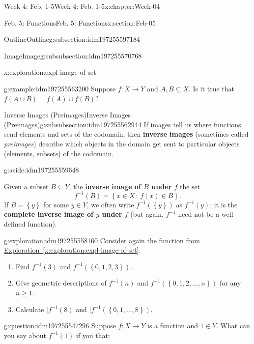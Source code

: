 \documentclass[oneside,10pt,]{book}
\newcommand{\xreffont}{\relax}
\newcommand{\terminology}[1]{\textbf{#1}}
\numberwithin{equation}{section}
\renewcommand{\ge}{\geqslant}
\newcommand{\set}[1]{\left\{ {#1} \right\}}
\newcommand{\setof}[2]{{\left\{#1\,\colon\,#2\right\}}}
\begin{document}
\begin{chapterptx}{Week 4: Feb. 1-5}{}{Week 4: Feb. 1-5}{}{}{x:chapter:Week-04}
\begin{sectionptx}{Feb. 5: Functions}{}{Feb. 5: Functions}{}{}{x:section:Feb-05}
\begin{subsectionptx}{Outline}{}{Outline}{}{}{g:subsection:idm197255597184}
\begin{subsubsectionptx}{Image}{}{Image}{}{}{g:subsubsection:idm197255570768}
\begin{exploration}{}{x:exploration:expl-image-of-set}
\end{exploration}%
\begin{example}{}{g:example:idm197255563200}%
Suppose \(f : X\to Y\) and \(A,B\subseteq X\). Is it true that \(f(A\cup B) = f(A)\cup f(B)\)?%
\end{example}
\end{subsubsectionptx}
%
%
\typeout{************************************************}
\typeout{************************************************}
%
\begin{subsubsectionptx}{Inverse Images (Preimages)}{}{Inverse Images (Preimages)}{}{}{g:subsubsection:idm197255562944}
If images tell us where functions send elements and sets of the codomain, then \terminology{inverse images} (sometimes called \emph{preimages}) describe which objects in the domain get sent to particular objects (elements, subsets) of the codomain. \begin{aside}{}{g:aside:idm197255559648}%
\end{aside}
%
\par
Given a subset \(B\subseteq Y\), the \terminology{inverse image of \(B\) under \(f\)} the set%
\begin{equation*}
f^{-1}(B) = \setof{x\in X}{f(x)\in B}.
\end{equation*}
If \(B = \set{y}\) for some \(y\in Y\), we often write \(f^{-1}(\set{y})\) as \(f^{-1}(y)\); it is the \terminology{complete inverse image of \(y\) under \(f\)} (but again, \(f^{-1}\) need not be a well-defined function).%
\begin{exploration}{}{g:exploration:idm197255558160}%
Consider again the function from \hyperref[x:exploration:expl-image-of-set]{Exploration~{\xreffont\ref{x:exploration:expl-image-of-set}}}.%
%
\begin{enumerate}
\item{}Find \(f^{-1}(3)\) and \(f^{-1}(\set{0,1,2,3})\).%
\item{}Give geometric descriptions of \(f^{-1}(n)\) and \(f^{-1}(\set{0,1,2,\ldots,n})\) for any \(n\ge 1\).%
\item{}Calculate \(|f^{-1}(8)\) and \(|f^{-1}(\set{0,1,\ldots,8})\).%
\end{enumerate}
\end{exploration}%
\begin{question}{}{g:question:idm197255547296}%
Suppose \(f : X\to Y\) is a function and \(1\in Y\). What can you say about \(f^{-1}(1)\) if you that:%
%
\begin{enumerate}

\end{enumerate}
\end{question}
\end{subsubsectionptx}
\end{subsectionptx}
\end{sectionptx}
\end{chapterptx}
\end{document}
